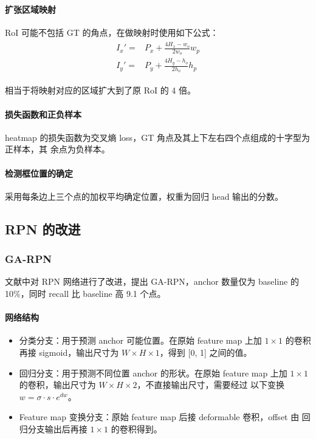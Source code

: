 \paragraph{扩张区域映射}
RoI 可能不包括 GT 的角点，在做映射时使用如下公式：
\begin{align}
  \begin{split}
    I_x' = & P_x + \frac{4H_{x} - w_o}{2w_o} w_p  \\
    I_y' = & P_y + \frac{4H_{y} - h_o}{2h_o} h_p
  \end{split}
\end{align}

相当于将映射对应的区域扩大到了原 RoI 的 4 倍。

\paragraph{损失函数和正负样本}
heatmap 的损失函数为交叉熵 loss，GT 角点及其上下左右四个点组成的十字型为正样本，其
余点为负样本。

\paragraph{检测框位置的确定}
采用每条边上三个点的加权平均确定位置，权重为回归 head 输出的分数。

\subsection{RPN 的改进}
\subsubsection{GA-RPN}\label{subsubsec:GA-RPN}
文献中对 RPN 网络进行了改进，提出 GA-RPN，anchor 数量仅为 baseline
的 10\%，同时 recall 比 baseline 高 9.1 个点。

\paragraph{网络结构}

\begin{itemize}
  \item 分类分支：用于预测 anchor 可能位置。在原始 feature map 上加 $1 \times 1$
    的卷积再接 sigmoid，输出尺寸为 $W \times H \times 1$，得到 [0, 1] 之间的值。
  \item 回归分支：用于预测不同位置 anchor 的形状。在原始 feature map 上加 $1
    \times 1$的卷积，输出尺寸为 $W \times H \times 2$，不直接输出尺寸，需要经过
    以下变换 $w = \sigma \cdot s \cdot e^{dw}$。
  \item Feature map 变换分支：原始 feature map 后接 deformable 卷积，offset 由
    回归分支输出后再接 $1 \times 1$ 的卷积得到。
\end{itemize}

